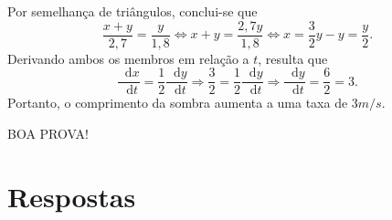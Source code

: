 \documentclass[12pt,a4paper]{article}
\newcommand*\diff{\mathop{}\!\mathrm{d}}
\begin{document}
\begin{ExerciseList}
Por semelhança de triângulos, conclui-se que
\[
\frac{x+y}{2,7} = \frac{y}{1,8}
\Leftrightarrow
x+y = \frac{2,7 y}{1,8}
\Leftrightarrow
x = \frac{3}{2} y - y = \frac{y}{2}.
\]
Derivando ambos os membros em relação a $t$, resulta que
\[
\frac{\diff x}{\diff t} = \frac{1}{2} \frac{\diff y}{\diff t}
\Rightarrow
\frac{3}{2} = \frac{1}{2} \frac{\diff y}{\diff t}
\Rightarrow
\frac{\diff y}{\diff t} = \frac{6}{2} = 3.
\]
Portanto, o comprimento da sombra aumenta a uma taxa de $3m/s$.
\end{ExerciseList}

\begin{center}
BOA PROVA!
\end{center}

\newpage
\restoregeometry
\section*{Respostas}
\shipoutAnswer
\end{document}

